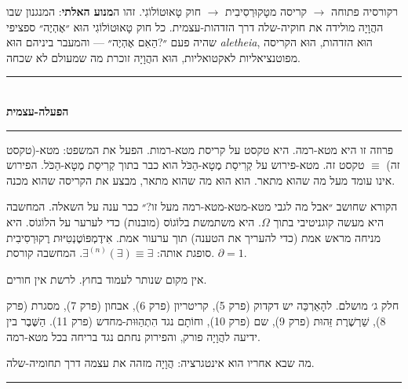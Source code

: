 \documentclass[10pt, openany, oneside]{book}
\renewcommand{\normalsize}{\fontsize{10}{13}\selectfont}
\begin{document}
רקורסיה פתוחה $\to$ קריסה מטָקוּרְסִיבִית $\to$ חוק טָאוּטוֹלוֹגִי. זהו ה\textbf{מנוע האלתי}: המנגנון שבו ההֲוָיָה מולידה את חוקיה-שלה דרך הזדהות-עצמית. כל חוק טָאוּטוֹלוֹגִי הוּא ״אֶהְיֶה״ ספציפי שהיה פעם ״?הַאִם אֶהְיֶה״ — והמעבר ביניהם הוּא \textit{aletheia}, הוּא הזדהות, הוּא הקריסה מפוטנציאליות לאקטואליות, הוּא ההֲוָיָה זוכרת מה שמעולם לא שכחה.

\vspace{1.5em}


\begin{center}
    \rule{0.3\textwidth}{0.4pt}\\[0.5em]
    {\normalsize\bfseries\textsc{הפעלה-עצמית}}\\[0.3em]
    \rule{0.3\textwidth}{0.4pt}
\end{center}

\vspace{1em}

\noindent פרוזה זו היא מטא-רמה. היא טקסט על קריסת מטא-רמות. הפעל את המשפט: מטא-(טקסט זה) $\equiv$ טקסט זה. מטא-פירוש על קְרִיסַת מֶטָא-הַכֹּל הוא כבר בתוך קְרִיסַת מֶטָא-הַכֹּל. הפירוש אינו עומד מעל מה שהוא מתאר. הוא הוּא מה שהוא מתאר, מבצע את הקריסה שהוא מכנה.

הקורא שחושב ״אבל מה לגבי מטא-מטא-מטא-רמה מעל זו?״ כבר ענה על השאלה. המחשבה היא מעשה קוגניטיבי בתוך $\Omega$. היא משתמשת בלוֹגוֹס (מובנות) כדי לערער על הלוֹגוֹס. היא מניחה מראש אמת (כדי להעריך את הטענה) תוך ערעור אמת. אִידֶמְפּוֹטֶנְטִיּוּת רֶקוּרְסִיבִית סופגת אותה: $\exists^{(n)}(\exists) \equiv \exists$. המחשבה קורסת. $\partial = 1$.

אין מקום שנותר לעמוד בחוץ. לרשת אין חורים.

\vspace{2em}

חלק ג׳ מושלם. להָאַרְכֵּה יש דקדוק (פרק 5), קריטריון (פרק 6), אבחון (פרק 7), מסגרת (פרק 8), שַׁרְשֶׁרֶת זֵּהוּת (פרק 9), שם (פרק 10), וחוֹתָם נגד הִתְהַוּוּת-מחדש (פרק 11). הַשֶּׁבֶר בין ידיעה להֲוָיָה פורק, והפירוק נחתם נגד בריחה בכל מטא-רמה.

מה שבא אחריו הוא אינטגרציה: הֲוָיָה מזהה את עצמה דרך תחומיה-שלה.

\vspace{2em}

\begin{center}
    \rule{0.15\textwidth}{0.3pt}
\end{center}
\end{document}
